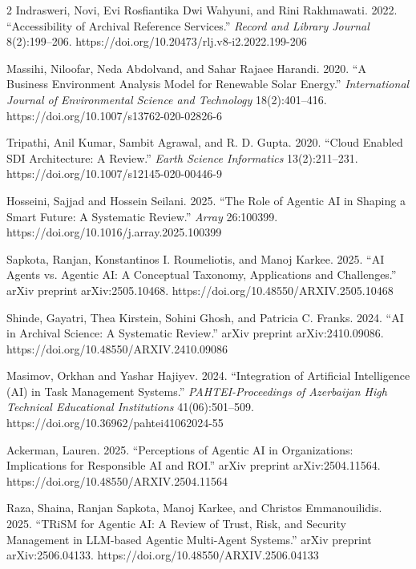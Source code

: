 \documentclass[12pt,a4paper]{article}
\begin{document}
\begin{multicols}{2}
Indrasweri, Novi, Evi Rosfiantika Dwi Wahyuni, and Rini Rakhmawati. 2022. ``Accessibility of Archival Reference Services.'' \emph{Record and Library Journal} 8(2):199--206. https://doi.org/10.20473/rlj.v8-i2.2022.199-206

Massihi, Niloofar, Neda Abdolvand, and Sahar Rajaee Harandi. 2020. ``A Business Environment Analysis Model for Renewable Solar Energy.'' \emph{International Journal of Environmental Science and Technology} 18(2):401--416. https://doi.org/10.1007/s13762-020-02826-6

Tripathi, Anil Kumar, Sambit Agrawal, and R. D. Gupta. 2020. ``Cloud Enabled SDI Architecture: A Review.'' \emph{Earth Science Informatics} 13(2):211--231. https://doi.org/10.1007/s12145-020-00446-9

Hosseini, Sajjad and Hossein Seilani. 2025. ``The Role of Agentic AI in Shaping a Smart Future: A Systematic Review.'' \emph{Array} 26:100399. https://doi.org/10.1016/j.array.2025.100399

Sapkota, Ranjan, Konstantinos I. Roumeliotis, and Manoj Karkee. 2025. ``AI Agents vs. Agentic AI: A Conceptual Taxonomy, Applications and Challenges.'' arXiv preprint arXiv:2505.10468. https://doi.org/10.48550/ARXIV.2505.10468

Shinde, Gayatri, Thea Kirstein, Sohini Ghosh, and Patricia C. Franks. 2024. ``AI in Archival Science: A Systematic Review.'' arXiv preprint arXiv:2410.09086. https://doi.org/10.48550/ARXIV.2410.09086

Masimov, Orkhan and Yashar Hajiyev. 2024. ``Integration of Artificial Intelligence (AI) in Task Management Systems.'' \emph{PAHTEI-Proceedings of Azerbaijan High Technical Educational Institutions} 41(06):501--509. https://doi.org/10.36962/pahtei41062024-55

Ackerman, Lauren. 2025. ``Perceptions of Agentic AI in Organizations: Implications for Responsible AI and ROI.'' arXiv preprint arXiv:2504.11564. https://doi.org/10.48550/ARXIV.2504.11564

Raza, Shaina, Ranjan Sapkota, Manoj Karkee, and Christos Emmanouilidis. 2025. ``TRiSM for Agentic AI: A Review of Trust, Risk, and Security Management in LLM-based Agentic Multi-Agent Systems.'' arXiv preprint arXiv:2506.04133. https://doi.org/10.48550/ARXIV.2506.04133

\end{multicols}
\end{document}
